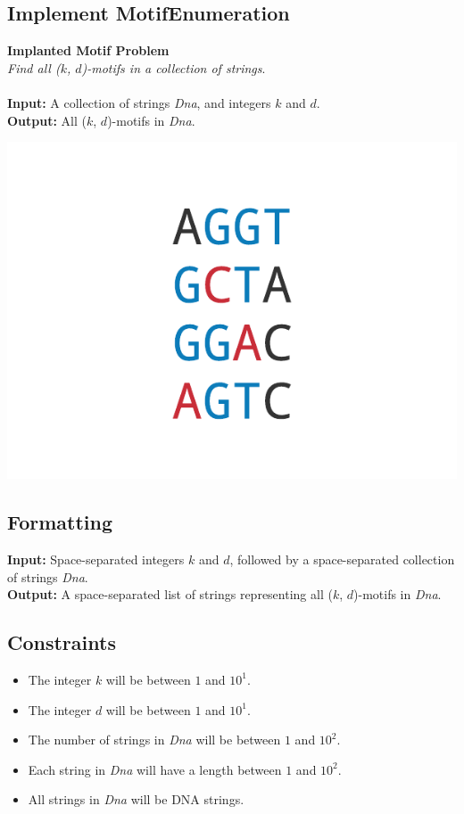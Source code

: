 \documentclass{article}
\begin{document}
\subsection{Implement MotifEnumeration}
\hline\vspace{5}
\noindent\textbf{Implanted Motif Problem}\\
\emph{Find all ($k$, $d$)-motifs in a collection of strings}.\\ \\
\textbf{Input:} A collection of strings \emph{Dna}, and integers $k$ and $d$.\\
\textbf{Output:} All ($k$, $d$)-motifs in \emph{Dna}.
\begin{center}
    \includegraphics[scale=0.42]{c2/logos/2A.png} 
\end{center}
\hline\vspace{5}

\subsection*{Formatting}
\textbf{Input:} Space-separated integers $k$ and $d$, followed by a space-separated collection of strings \emph{Dna}.\\
\noindent\textbf{Output:} A space-separated list of strings representing all ($k$, $d$)-motifs in \emph{Dna}.

\subsection*{Constraints}
\begin{itemize}
    \item The integer $k$ will be between $1$ and $10^1$.
    \item The integer $d$ will be between $1$ and $10^1$.
    \item The number of strings in \emph{Dna} will be between $1$ and $10^2$.
    \item Each string in \emph{Dna} will have a length between $1$ and $10^2$.
    \item All strings in \emph{Dna} will be DNA strings.
\end{itemize}
\pagebreak
\end{document}
